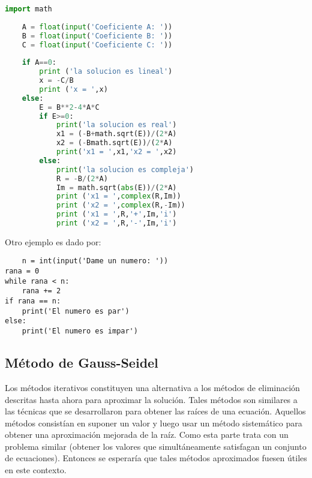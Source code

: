     \begin{lstlisting}[language=Python]
        import math
    
    A = float(input('Coeficiente A: '))
    B = float(input('Coeficiente B: '))
    C = float(input('Coeficiente C: '))
    
    if A==0: 
        print ('la solucion es lineal')
        x = -C/B
        print ('x = ',x)
    else:
        E = B**2-4*A*C
        if E>=0:
            print('la solucion es real')
            x1 = (-B+math.sqrt(E))/(2*A)
            x2 = (-Bmath.sqrt(E))/(2*A)
            print('x1 = ',x1,'x2 = ',x2)
        else: 
            print('la solucion es compleja')
            R = -B/(2*A)
            Im = math.sqrt(abs(E))/(2*A)
            print ('x1 = ',complex(R,Im))
            print ('x2 = ',complex(R,-Im))
            print ('x1 = ',R,'+',Im,'i')
            print ('x2 = ',R,'-',Im,'i')
    \end{lstlisting}
Otro ejemplo es dado por:
\begin{lstlisting}
    n = int(input('Dame un numero: '))
rana = 0
while rana < n:
    rana += 2
if rana == n:
    print('El numero es par')
else: 
    print('El numero es impar')
\end{lstlisting}
\subsection{Método de Gauss-Seidel}
Los métodos iterativos constituyen una alternativa a los métodos de eliminación descritas hasta ahora para aproximar la solución. Tales métodos son similares a las técnicas que se desarrollaron para obtener las raíces de una ecuación. Aquellos métodos consistían en suponer un valor y luego usar un método sistemático para obtener una aproximación mejorada de la raíz. Como esta parte trata con un problema similar (obtener los valores que simultáneamente satisfagan un conjunto de ecuaciones). Entonces se esperaría que tales métodos aproximados fuesen útiles en este contexto.


